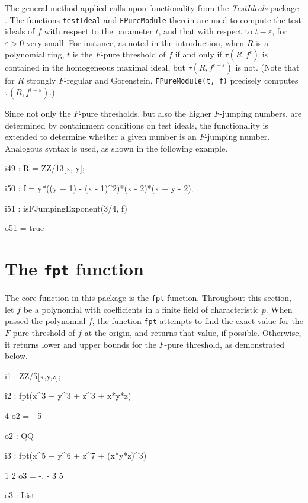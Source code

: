 \documentclass{amsart}
\begin{document}
The general method applied calls upon functionality from the \emph{TestIdeals} package \cite{TestIdealsPackage, TestIdealsPaper}.  The functions {\tt testIdeal} and {\tt FPureModule} therein are used
to compute the test ideals of $f$ with respect to the parameter $t$, and that with respect to $t - \varepsilon$, for $\varepsilon>0$ very small. For instance, as noted in the introduction, when $R$ is a polynomial ring, $t$ is the $F$-pure threshold of $f$ if and only if $\tau(R, f^t)$ is contained in the homogeneous maximal ideal, but
$\tau(R, f^{t-\varepsilon})$ is not.
(Note that for $R$ strongly $F$-regular and Gorenstein, {\tt FPureModule(t, f)} precisely computes $\tau(R, f^{t-\varepsilon})$.)

Since not only the $F$-pure thresholds, but also the higher $F$-jumping numbers, are determined by containment conditions on test ideals, the functionality is extended to determine whether a given number is an $F$-jumping number.
Analogous syntax is used, as shown in the following example.

{\small
{}
\begin{MyVerbatim}

i49 : R = ZZ/13[x, y];

i50 : f = y*((y + 1) - (x - 1)^2)*(x - 2)*(x + y - 2);

i51 : isFJumpingExponent(3/4, f)

o51 = true
\end{MyVerbatim}
}
\medspace

\section{The {\tt fpt} function}
\label{sec.FPT}

The core function in this package is the {\tt fpt} function.  Throughout this section, let $f$ be a polynomial with coefficients in a finite field of characteristic $p$. When passed the polynomial $f$, the function {\tt fpt} attempts to find the exact value for the $F$-pure threshold of $f$ at the origin, and returns that value, if possible.  Otherwise, it returns lower and upper bounds for the $F$-pure threshold, as demonstrated below.

{\small
{}
\begin{MyVerbatim}

i1 : ZZ/5[x,y,z];

i2 : fpt(x^3 + y^3 + z^3 + x*y*z)

     4
o2 = -
     5

o2 : QQ

i3 : fpt(x^5 + y^6 + z^7 + (x*y*z)^3)

      1  2
o3 = {-, -}
      3  5

o3 : List
\end{MyVerbatim}
}
\medspace
\end{document}
